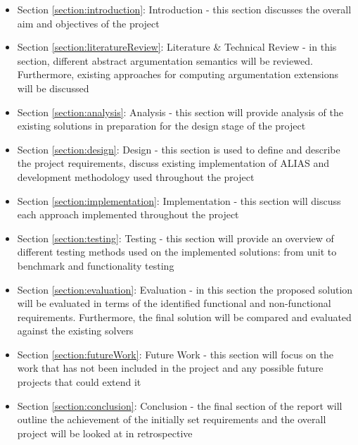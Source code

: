 \begin{itemize}
	\item Section \ref{section:introduction}: Introduction - this section discusses the overall aim and objectives of the project
	\item Section \ref{section:literatureReview}: Literature \& Technical Review - in this section, different abstract argumentation semantics will be reviewed. Furthermore, existing approaches for computing argumentation extensions will be discussed
	\item Section \ref{section:analysis}: Analysis - this section will provide analysis of the existing solutions in preparation for the design stage of the project
	\item Section \ref{section:design}: Design - this section is used to define and describe the project requirements, discuss existing implementation of ALIAS and development methodology used throughout the project
	\item Section \ref{section:implementation}: Implementation - this section will discuss each approach implemented throughout the project
	\item Section \ref{section:testing}: Testing - this section will provide an overview of different testing methods used on the implemented solutions: from unit to benchmark and functionality testing
	\item Section \ref{section:evaluation}: Evaluation - in this section the proposed solution will be evaluated in terms of the identified functional and non-functional requirements. Furthermore, the final solution will be compared and evaluated against the existing solvers	\item Section \ref{section:futureWork}: Future Work - this section will focus on the work that has not been included in the project and any possible future projects that could extend it
	\item Section \ref{section:conclusion}: Conclusion - the final section of the report will outline the achievement of the initially set requirements and the overall project will be looked at in retrospective 
\end{itemize}
